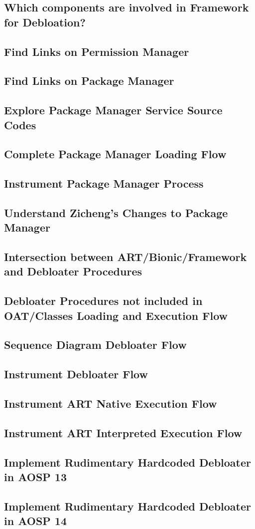 \subsection{Which components are involved in Framework for Debloation?}
\subsection{Find Links on Permission Manager}
\subsection{Find Links on Package Manager}
\subsection{Explore Package Manager Service Source Codes}
\subsection{Complete Package Manager Loading Flow}
\subsection{Instrument Package Manager Process}
\subsection{Understand Zicheng's Changes to Package Manager}

\subsection{Intersection between ART/Bionic/Framework and Debloater Procedures}

\subsection{Debloater Procedures not included in OAT/Classes Loading and Execution Flow}

\subsection{Sequence Diagram Debloater Flow}

\subsection{Instrument Debloater Flow}

\subsection{Instrument ART Native Execution Flow}

\subsection{Instrument ART Interpreted Execution Flow}

\subsection{Implement Rudimentary Hardcoded Debloater in AOSP 13}

\subsection{Implement Rudimentary Hardcoded Debloater in AOSP 14}
